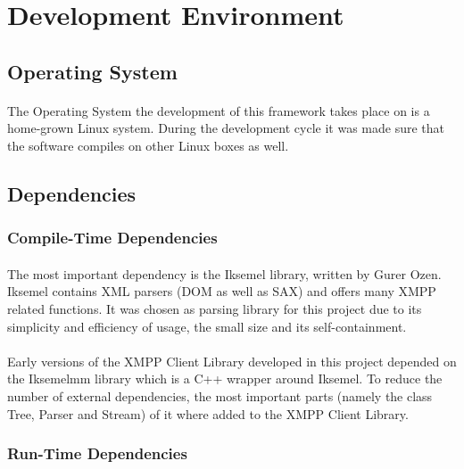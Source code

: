 \section{Development Environment}
\paragraph{}

\subsection{Operating System}
\paragraph{}
The Operating System the development of this framework takes place on is a home-grown Linux system. During the development cycle it was made sure that the software compiles on other Linux boxes as well.

\subsection{Dependencies}
\label{sec:depend}

\subsubsection{Compile-Time Dependencies}
\paragraph{}
The most important dependency is the Iksemel library, written by Gurer Ozen. Iksemel contains XML parsers (DOM as well as SAX) and offers many XMPP related functions. It was chosen as parsing library for this project due to its simplicity and efficiency of usage, the small size and its self-containment.

\paragraph{}
Early versions of the XMPP Client Library developed in this project depended on the Iksemelmm library which is a C++ wrapper around Iksemel. To reduce the number of external dependencies, the most important parts (namely the class Tree, Parser and Stream) of it where added to the XMPP Client Library.


\subsubsection{Run-Time Dependencies}
